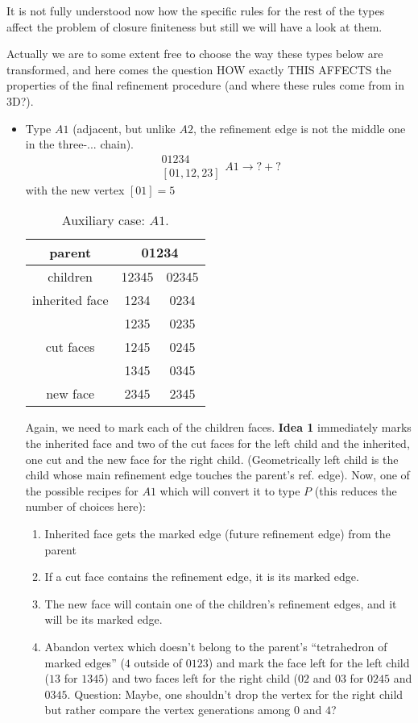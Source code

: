 \documentclass[a4paper,12pt]{amsart}
\numberwithin{equation}{section}
\begin{document}
It is not fully understood now how the specific rules for the rest of the types affect the problem of closure finiteness but still we will have a look at them.

Actually we are to some extent free to choose the way these types below are transformed, and here comes the question HOW exactly THIS AFFECTS the properties of the final refinement procedure (and where these rules come from in 3D?).


\begin{itemize}
	\item Type $A1$ (adjacent, but unlike $A2$, the refinement edge is not the middle one in the three-... chain).
	$$ \begin{array}{c} 01234 \\ \left[01,12,23\right] \end{array} A1
	\rightarrow ? + ? $$
	with the new vertex $\left[01\right] = 5$
	\begin{table}[h!]
	\caption{Auxiliary case: $A1$.}
	\label{tab:Case4}
	\begin{tabular}{|c|c|c|} \hline
	parent & \multicolumn{2}{|c|}{01234} \\ \hline
	children & 12345 & 02345 \\ \hline
	inherited face & 1234 & 0234 \\ \hline
	\multirow{3}{*}{cut faces} & 1235 & 0235 \\ 
	 & 1245 & 0245 \\ 
	 & 1345 & 0345 \\ \hline
	 new face & 2345 & 2345 \\ \hline
	\end{tabular}
	\end{table}    
    Again, we need to mark each of the children faces. 
    \textbf{Idea 1} immediately marks the inherited face and two of the cut faces for the left child and the inherited, one cut and the new face for the right child. (Geometrically left child is the child whose main refinement edge touches the parent's ref. edge).
    Now, one of the possible recipes for $A1$ which will convert it to type $P$ (this reduces the number of choices here):
    	\begin{enumerate}
		\item Inherited face gets the marked edge (future refinement edge) from the parent
		\item If a cut face contains the refinement edge, it is its marked edge.
		\item The new face will contain one of the children's refinement edges, and it will be its marked edge.
		\item Abandon vertex which doesn't belong to the parent's ``tetrahedron of marked edges'' ($4$ outside of $0123$) and mark the face left for the left child ($13$ for $1345$) and two faces left for the right child ($02$ and $03$ for $0245$ and $0345$.
		Question: Maybe, one shouldn't drop the vertex for the right child but rather compare the vertex generations among $0$ and $4$?
	\end{enumerate}


\end{itemize}
\end{document}
